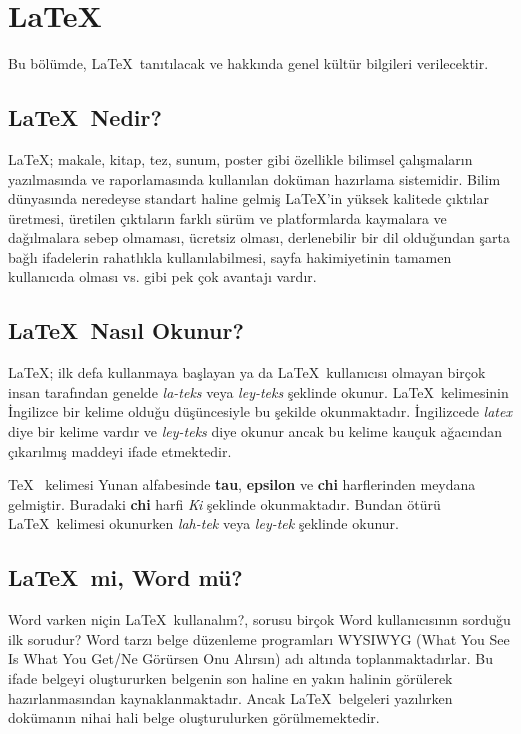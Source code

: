 \newcommand{\latex}{\LaTeX~}
\newcommand{\latexx}{\LaTeX}

\chapter{\latex}

Bu bölümde, \latex tanıtılacak ve hakkında genel kültür bilgileri verilecektir.

\section{\latex Nedir?}
\latexx; makale, kitap, tez, sunum, poster gibi özellikle bilimsel çalışmaların yazılmasında ve raporlamasında kullanılan doküman hazırlama sistemidir. Bilim dünyasında neredeyse standart haline gelmiş \latexx'in yüksek kalitede çıktılar üretmesi, üretilen çıktıların farklı sürüm ve platformlarda kaymalara ve dağılmalara sebep olmaması, ücretsiz olması, derlenebilir bir dil olduğundan şarta bağlı ifadelerin rahatlıkla kullanılabilmesi, sayfa hakimiyetinin tamamen kullanıcıda olması vs. gibi pek çok avantajı vardır.

\section{\latex Nasıl Okunur?}
\latexx; ilk defa kullanmaya başlayan ya da \latex kullanıcısı olmayan birçok insan tarafından genelde \textit{la-teks} veya \textit{ley-teks} şeklinde okunur. \latex kelimesinin İngilizce bir kelime olduğu düşüncesiyle bu şekilde okunmaktadır. İngilizcede \textit{latex} diye bir kelime vardır ve \textit{ley-teks} diye okunur ancak bu kelime kauçuk ağacından çıkarılmış maddeyi ifade etmektedir. 

\TeX~ kelimesi Yunan alfabesinde \textbf{tau}, \textbf{epsilon} ve \textbf{chi} harflerinden meydana gelmiştir. Buradaki \textbf{chi} harfi  \textit{Ki} şeklinde okunmaktadır. Bundan ötürü \latex kelimesi okunurken \textit{lah-tek} veya \textit{ley-tek} şeklinde okunur. 

\section{\latex mi, Word mü?}
Word varken niçin \latex kullanalım?, sorusu birçok Word kullanıcısının sorduğu ilk sorudur? Word tarzı belge düzenleme programları WYSIWYG (What You See Is What You Get/Ne Görürsen Onu Alırsın) adı altında toplanmaktadırlar. Bu ifade belgeyi oluştururken belgenin son haline en yakın halinin görülerek hazırlanmasından kaynaklanmaktadır. Ancak \latex belgeleri yazılırken dokümanın nihai hali belge oluşturulurken görülmemektedir.

